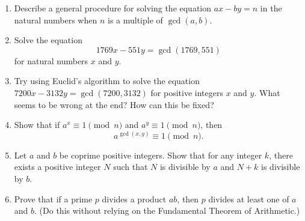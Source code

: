 \documentclass[a4paper,10pt]{article}
\begin{document}
\begin{enumerate}
\item Describe a general procedure for solving the equation $ax-by=n$ in the
natural numbers when $n$ is a multiple of $\gcd(a,b)$.
\item Solve the equation \[1769x-551y=\gcd(1769,551)\] for natural numbers $x$ and $y$.
\item Try using Euclid's algorithm to solve the equation $7200x-3132y=\gcd(7200,3132)$ for positive integers $x$ and $y$. What seems to be wrong at the end?
How can this be fixed?
\item Show that if $a^x\equiv1\pmod{n}$ and $a^y\equiv1\pmod{n}$, then
\[a^{\gcd(x,y)}\equiv1\pmod{n}.\]
\item Let $a$ and $b$ be coprime positive integers. Show that for
any integer $k$, there exists a positive integer $N$ such
that $N$ is divisible by $a$ and $N+k$ is divisible by $b$.
\item Prove that if a prime $p$ divides a product $ab$, then $p$ divides
at least one of $a$ and $b$. (Do this without relying on the Fundamental
Theorem of Arithmetic.)
\end{enumerate}
\end{document}
